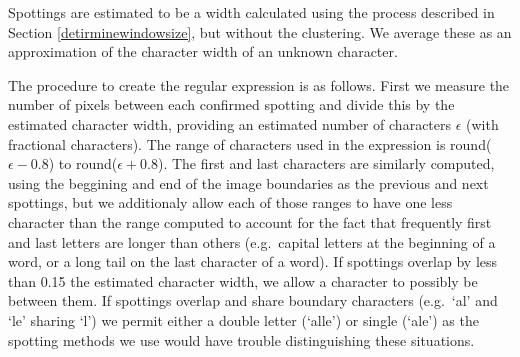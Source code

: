 \documentclass[ms,electronic,twosidetoc,letterpaper,chaptercenter,parttop,lof,lot]{byumsphd}
\begin{document}
Spottings are estimated to be a width calculated using the process described in Section \ref{detirminewindowsize}, but without the clustering.
We average these as an approximation of the character width of an unknown character.

The procedure to create the regular expression is as follows. First we measure the number of pixels between each confirmed spotting and divide this by the estimated character width, providing an estimated number of characters $\epsilon$ (with fractional characters). The range of characters used in the expression is 
round($\epsilon-0.8$) to round($\epsilon+0.8$).
 The first and last characters are similarly computed, using the beggining and end of the image boundaries as the previous and next spottings, but we additionaly allow each of those ranges to have one less character than the range computed to account for the fact that frequently first and last letters are longer than others (e.g.~capital letters at the beginning of a word, or a long tail on the last character of a word). If spottings overlap by less than 0.15 the estimated character width, we allow a character to possibly be between them. If spottings overlap and share boundary characters (e.g.~`al' and `le' sharing `l') we permit either a double letter (`alle') or single (`ale') as the spotting methods we use would have trouble distinguishing these situations. 

% 
%  
\end{document}
